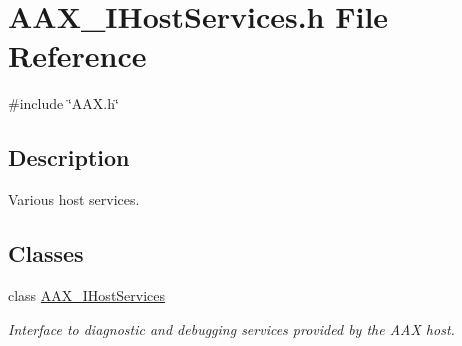 \hypertarget{a00611}{}\section{A\+A\+X\+\_\+\+I\+Host\+Services.\+h File Reference}
\label{a00611}
{\ttfamily \#include \char`\"{}A\+A\+X.\+h\char`\"{}}\newline


\subsection{Description}
Various host services. 

\subsection*{Classes}
\begin{DoxyCompactItemize}
\item 
class \mbox{\hyperlink{a01841}{A\+A\+X\+\_\+\+I\+Host\+Services}}
\begin{DoxyCompactList}\small\item\em Interface to diagnostic and debugging services provided by the A\+AX host. \end{DoxyCompactList}\end{DoxyCompactItemize}
